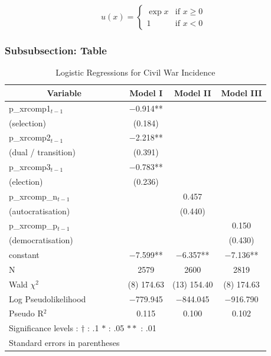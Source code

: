 \documentclass[a4paper,12pt]{article}
\begin{document}
\begin{equation}
  u(x) =
  \begin{cases}
   \exp{x} & \text{if } x \geq 0 \\
   1       & \text{if } x < 0
  \end{cases}
\end{equation}

\vspace{.5cm}

\subsubsection{Subsubsection: Table}
\label{subsub:table}

\def\onepc{$^{\ast\ast}$} \def\fivepc{$^{\ast}$}
\def\tenpc{$^{\dag}$}
\def\legend{\multicolumn{4}{l}{\footnotesize{Significance levels
:\hspace{1em} $\dag$ : .1 \hspace{1em}
$\ast$ : .05 \hspace{1em} $\ast\ast$ : .01 \normalsize}}}

\begin{table}[htbp]\centering \footnotesize \caption{Logistic Regressions for Civil War Incidence \label{table1:sumstats}}
\begin{tabular}{l c c c}\hline\hline
\multicolumn{1}{c}{\textbf{Variable}} & \textbf{Model I}
 & \textbf{Model II}& \textbf{Model III}\\ \hline
p\_xrcomp1$_{t-1}$ & $-$0.914**\\
(selection) & (0.184)\\
p\_xrcomp2$_{t-1}$ & $-$2.218**\\
(dual / transition) & (0.391)\\
p\_xrcomp3$_{t-1}$ & $-$0.783**\\
(election) & (0.236)\\
p\_xrcomp\_n$_{t-1}$ & & 0.457\\
(autocratisation) & & (0.440)\\
p\_xrcomp\_p$_{t-1}$ & & & 0.150\\
(democratisation) & & & (0.430)\\
constant & $-$7.599** & $-$6.357** & $-$7.136**\\
\hline
N & 2579 & 2600 & 2819\\
Wald $\chi^2$ & (8) 174.63 & (13) 154.40 & (8) 174.63\\
Log Pseudolikelihood & $-$779.945 & $-$844.045 & $-$916.790\\
Pseudo R$^2$ & 0.115 & 0.100 & 0.102\\
\hline
\legend\\
{\footnotesize Standard errors in parentheses}\\
\hline
\end{tabular}
\end{table}

\newpage


\end{document}
